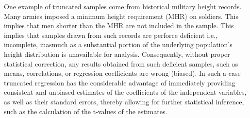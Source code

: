 One example of truncated samples come from historical military height records. Many armies imposed a minimum height requirement (MHR) on soldiers. This implies that men shorter than the MHR are not included in the sample. This implies that samples drawn from such records are perforce deficient i.e., incomplete, inasmuch as a substantial portion of the underlying population's height distribution is unavailable for analysis. Consequently, without proper statistical correction, any results obtained from such deficient samples, such as means, correlations, or regression coefficients are wrong (biased). In such a case truncated regression has the considerable advantage of immediately providing consistent and unbiased estimates of the coefficients of the independent variables, as well as their standard errors, thereby allowing for further statistical inference, such as the calculation of the t-values of the estimates.

